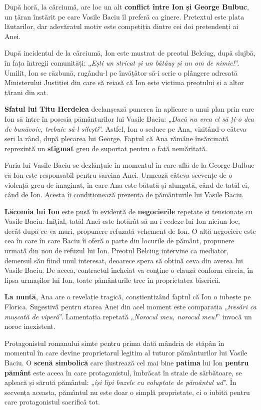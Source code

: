 \documentclass{article}
\newcommand{\qu}[1]{„\emph{#1}”}
\begin{document}
După horă, la cârciumă, are loc un alt \textbf{conflict între Ion și George Bulbuc}, un țăran înstărit pe care Vasile Baciu îl preferă ca ginere. Pretextul este plata lăutarilor, dar adevăratul motiv este competiția dintre cei doi pretendenți ai Anei.

După incidentul de la cârciumă, Ion este mustrat de preotul Belciug, după slujbă, în fața întregii comunități: \qu{Ești un stricat și un bătăuș și un om de nimic!}. Umilit, Ion se răzbună, rugându-l pe învățător să-i scrie o plângere adresată Ministerului Justiției din care să reiasă că Ion este victima preotului și a altor țărani din sat.

\textbf{Sfatul lui Titu Herdelea} declanșează punerea în aplicare a unui plan prin care Ion să intre în posesia pământurilor lui Vasile Baciu: \qu{Dacă nu vrea el să ți-o dea de bunăvoie, trebuie să-l silești}. Astfel, Ion o seduce pe Ana, vizitând-o câteva seri la rând, după plecarea lui George. Faptul că Ana rămâne însărcinată reprezintă un \textbf{stigmat} greu de suportat pentru o fată nemăritată.

Furia lui Vasile Baciu se dezlănțuie în momentul în care află de la George Bulbuc că Ion este responsabil pentru sarcina Anei. Urmează câteva secvențe de o violență greu de imaginat, în care Ana este bătută și alungată, când de tatăl ei, când de Ion. Acesta îi condiționează prezența de pământurile lui Vasile Baciu.

\textbf{Lăcomia lui Ion} este pusă în evidență de \textbf{negocierile} repetate și tensionate cu Vasile Baciu. Inițial, tatăl Anei este hotărât să nu-i cedeze lui Ion niciun loc, decât după ce va muri, propunere refuzată vehement de Ion. O altă negociere este cea în care în care Baciu îi oferă o parte din locurile de pământ, propunere urmată din nou de refuzul lui Ion. Preotul Belciug intervine ca mediator, demersul său fiind unul interesat, deoarece spera să obțină ceva din averea lui Vasile Baciu. De aceea, contractul încheiat va conține o clauză conform căreia, în lipsa urmașilor lui Ion, toate pământurile trec în proprietatea bisericii.

\textbf{La nuntă}, Ana are o revelație tragică, conștientizând faptul că Ion o iubește pe Florica. Sugestivă pentru starea Anei din acel moment este comparația \qu{tresări ca mușcată de viperă}. Lamentația repetată \qu{Norocul meu, norocul meu!} invocă un noroc inexistent.

Protagonistul romanului simte pentru prima dată mândria de stăpân în momentul în care devine proprietarul legitim al tuturor pământurilor lui Vasile Baciu. O \textbf{scenă simbolică} care ilustrează cel mai bine \textbf{patima} lui Ion \textbf{pentru pământ} este aceea în care protagonistul, îmbrăcat în straie de sărbătoare, se apleacă și sărută pământul: \qu{își lipi buzele cu voluptate de pământul ud}. În secvența aceasta, pământul nu este doar o simplă proprietate, ci o iubită pentru care protagonistul sacrifică tot.
\end{document}
